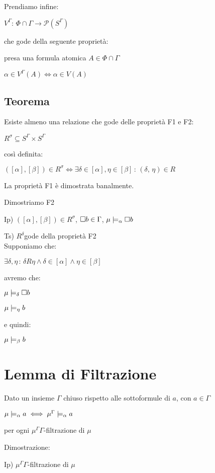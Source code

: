 Prendiamo infine:

$V^{\Gamma}:\,\Phi\cap\Gamma\rightarrow\mathcal{P}(S^{\Gamma})$

che gode della seguente proprietà:

presa una formula atomica $A\in\Phi\cap\Gamma$

$\alpha\in V^{\Gamma}(A)\iff\alpha\in V(A)$


\subsection{Teorema}

Esiste almeno una relazione che gode delle proprietà F1 e F2:

$R^{\sigma}\subseteq S^{\Gamma}\times S^{\Gamma}$

così definita:

$([\alpha],[\beta])\in R^{\sigma}\iff\exists\delta\in[\alpha],\eta\in[\beta]\,:\,(\delta,\,\eta)\in R$

La proprietà F1 è dimostrata banalmente.

Dimostriamo F2

Ip) $([\alpha],[\beta])\in R^{\sigma}$, $\square b\in\Gamma$, $\mu\models_{\alpha}\square b$

Ts) $R^{\delta}$gode della proprietà F2\\


Supponiamo che:

$\exists\delta,\eta\,:\,\delta R\eta\wedge\delta\in[\alpha]\wedge\eta\in[\beta]$

avremo che:

$\mu\models_{\delta}\square b$

$\mu\models_{\eta}b$

e quindi:

$\mu\models_{\beta}b$\\



\section{Lemma di Filtrazione}

Dato un insieme $\Gamma$ chiuso rispetto alle sottoformule di $a$,
con $a\in\Gamma$

$\mu\models_{\alpha}a\iff\mu^{\Gamma}\models_{\alpha}a$

per ogni $\mu^{\Gamma}$$\Gamma$-filtrazione di $\mu$

Dimostrazione:

Ip) $\mu^{\Gamma}$$\Gamma$-filtrazione di $\mu$

